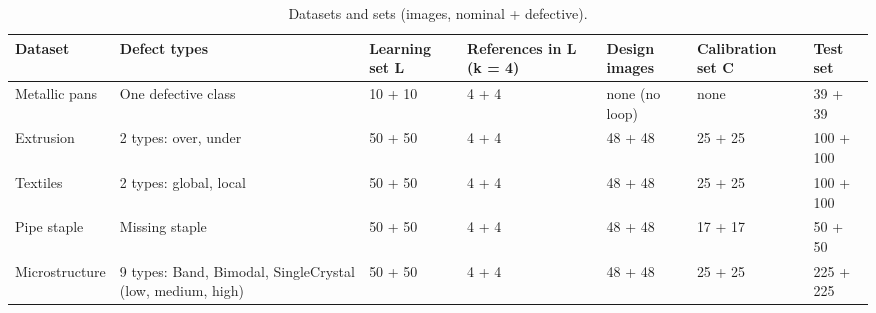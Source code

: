 \begin{table}

\caption{\label{tab:tbl-sets}Datasets and sets (images, nominal + defective).}
\centering
\begin{tabular}[t]{lllllll}
\toprule
Dataset & Defect types & Learning set L & References in L (k = 4) & Design images & Calibration set C & Test set\\
\midrule
Metallic pans & One defective class & 10 + 10 & 4 + 4 & none (no loop) & none & 39 + 39\\
Extrusion & 2 types: over, under & 50 + 50 & 4 + 4 & 48 + 48 & 25 + 25 & 100 + 100\\
Textiles & 2 types: global, local & 50 + 50 & 4 + 4 & 48 + 48 & 25 + 25 & 100 + 100\\
Pipe staple & Missing staple & 50 + 50 & 4 + 4 & 48 + 48 & 17 + 17 & 50 + 50\\
Microstructure & 9 types: Band, Bimodal, SingleCrystal (low, medium, high) & 50 + 50 & 4 + 4 & 48 + 48 & 25 + 25 & 225 + 225\\
\bottomrule
\end{tabular}
\end{table}
